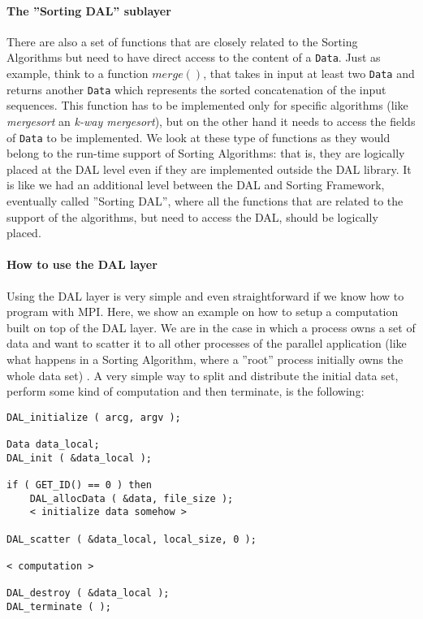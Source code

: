 \paragraph{The ''Sorting DAL'' sublayer} There are also a set of functions that are closely related to the Sorting Algorithms but need to have direct access to the content of a \texttt{Data}.  Just as example, think to a function $merge()$, that takes in input at least two \texttt{Data} and returns another \texttt{Data} which represents the sorted concatenation of the input sequences. This function has to be implemented only for specific algorithms (like \textit{mergesort} an \textit{k-way mergesort}), but on the other hand it needs to access the fields of \texttt{Data} to be implemented. We look at these type of functions as they would belong to the run-time support of Sorting Algorithms: that is, they are logically placed at the DAL level even if they are implemented outside the DAL library. It is like we had an additional level between the DAL and Sorting Framework, eventually called ''Sorting DAL'', where all the functions that are related to the support of the algorithms, but need to access the DAL, should be logically placed. 

\paragraph{How to use the DAL layer} Using the DAL layer is very simple and even straightforward if we know how to program with MPI. Here, we show an example on how to setup a computation built on top of the DAL layer. We are in the case in which a process owns a set of data and want to scatter it to all other processes of the parallel application (like what happens in a Sorting Algorithm, where a ''root'' process initially owns the whole data set) . A very simple way to split and distribute the initial data set, perform some kind of computation and then terminate, is the following:
\begin{lstlisting}
DAL_initialize ( arcg, argv );

Data data_local;
DAL_init ( &data_local );

if ( GET_ID() == 0 ) then
	DAL_allocData ( &data, file_size );
	< initialize data somehow >
	
DAL_scatter ( &data_local, local_size, 0 );

< computation >

DAL_destroy ( &data_local );	
DAL_terminate ( );
\end{lstlisting}


